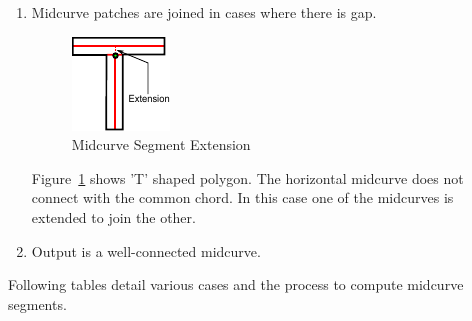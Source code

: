 \begin{enumerate} [noitemsep,topsep=2pt,parsep=2pt,partopsep=2pt]

Figure~\ref{fig_polymid} shows midcurve segment computed for one of the cells. In shapes like 'L' midcurves from both sub-polygons, across the chord, join together at a vertex, naturally. Additional extensions are not required.

\item Midcurve patches are joined in cases where there is gap.


\begin{figure}[h]
\centering \includegraphics[width=0.25\linewidth]{images/midcurve_extend_2.pdf} 
\caption{Midcurve Segment Extension}
\label{fig_extend}
\end{figure}


Figure~\ref{fig_extend} shows  'T' shaped polygon. The horizontal midcurve does not connect with the common chord. In this case one of the midcurves is extended to join the other. 

\item Output is a well-connected midcurve.
\end{enumerate}

Following tables detail various cases and the process to compute midcurve segments.

\def\trianglecasestablewidth{0.45}

\bigskip

